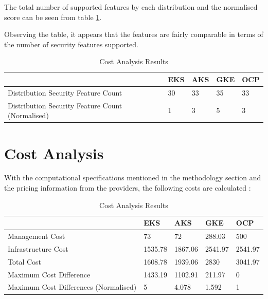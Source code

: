 The total number of supported features by each distribution and the normalised score can be seen from table \ref{tab:feature-score}.

Observing the table, it appears that the features are fairly comparable in terms of the number of security features supported.

\begin{table}[!ht]
    \centering
    \begin{tabular}{|p{4cm}|p{2cm}|p{2cm}|p{2cm}|p{2cm}|} %
    \hline
         & EKS & AKS & GKE & OCP \\ \hline
        Distribution Security Feature Count& 30& 33& 35& 33\\ \hline
 Distribution Security Feature Count (Normalised)& 1& 3& 5&3\\\hline
    \end{tabular}
    \caption{Cost Analysis Results} 
    \label{tab:feature-score}
\end{table}

\section{Cost Analysis}

With the computational specifications mentioned in the methodology section and the pricing information from the providers, the following costs are calculated \cite{CreateEstimateConfigure,PricingAzureKubernetes,GoogleCloudPricing,RedHatOpenShiftd}:
\begin{table}[!ht]
    \centering
    \begin{tabular}{|p{4cm}|p{2cm}|p{2cm}|p{2cm}|p{2cm}|} %
    \hline
         & EKS & AKS & GKE & OCP \\ \hline
        Management Cost & 73 & 72 & 288.03 & 500 \\ \hline
        Infrastructure Cost & 1535.78 & 1867.06 & 2541.97 & 2541.97 \\ \hline
        Total Cost & 1608.78 & 1939.06 & 2830 & 3041.97 \\ \hline
        Maximum Cost Difference & 1433.19 & 1102.91 & 211.97 & 0 \\ \hline
        Maximum Cost Differences (Normalised) & 5 & 4.078 & 1.592 & 1 \\ \hline
    \end{tabular}
    \caption{Cost Analysis Results} 
    \label{tab:cost-analysis}
\end{table}


